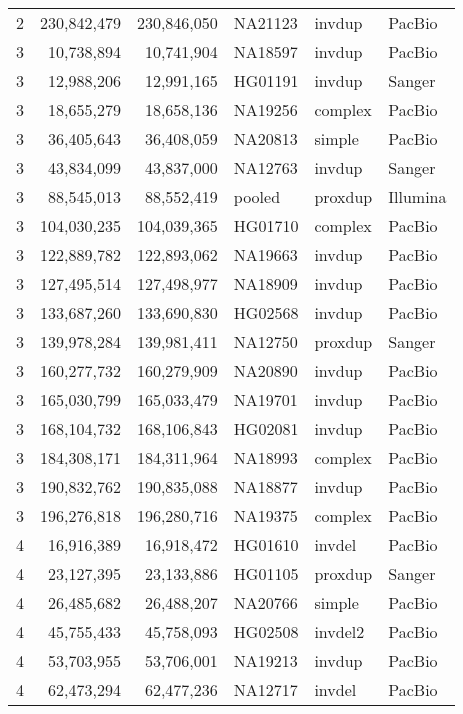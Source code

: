 {\begin{longtable}{rrrlll}
    2   & 230,842,479 & 230,846,050 & NA21123 & invdup  & PacBio  \\
    3   & 10,738,894  & 10,741,904  & NA18597 & invdup  & PacBio  \\
    3   & 12,988,206  & 12,991,165  & HG01191 & invdup  & Sanger  \\
    3   & 18,655,279  & 18,658,136  & NA19256 & complex & PacBio  \\
    3   & 36,405,643  & 36,408,059  & NA20813 & simple  & PacBio  \\
    3   & 43,834,099  & 43,837,000  & NA12763 & invdup  & Sanger  \\
    3   & 88,545,013  & 88,552,419  & pooled  & proxdup & Illumina  \\
    3   & 104,030,235 & 104,039,365 & HG01710 & complex & PacBio  \\
    3   & 122,889,782 & 122,893,062 & NA19663 & invdup  & PacBio  \\
    3   & 127,495,514 & 127,498,977 & NA18909 & invdup  & PacBio  \\
    3   & 133,687,260 & 133,690,830 & HG02568 & invdup  & PacBio  \\
    3   & 139,978,284 & 139,981,411 & NA12750 & proxdup & Sanger  \\
    3   & 160,277,732 & 160,279,909 & NA20890 & invdup  & PacBio  \\
    3   & 165,030,799 & 165,033,479 & NA19701 & invdup  & PacBio  \\
    3   & 168,104,732 & 168,106,843 & HG02081 & invdup  & PacBio  \\
    3   & 184,308,171 & 184,311,964 & NA18993 & complex & PacBio  \\
    3   & 190,832,762 & 190,835,088 & NA18877 & invdup  & PacBio  \\
    3   & 196,276,818 & 196,280,716 & NA19375 & complex & PacBio  \\
    4   & 16,916,389  & 16,918,472  & HG01610 & invdel  & PacBio  \\
    4   & 23,127,395  & 23,133,886  & HG01105 & proxdup & Sanger  \\
    4   & 26,485,682  & 26,488,207  & NA20766 & simple  & PacBio  \\
    4   & 45,755,433  & 45,758,093  & HG02508 & invdel2 & PacBio  \\
    4   & 53,703,955  & 53,706,001  & NA19213 & invdup  & PacBio  \\
    4   & 62,473,294  & 62,477,236  & NA12717 & invdel  & PacBio  \\

\end{longtable}}
